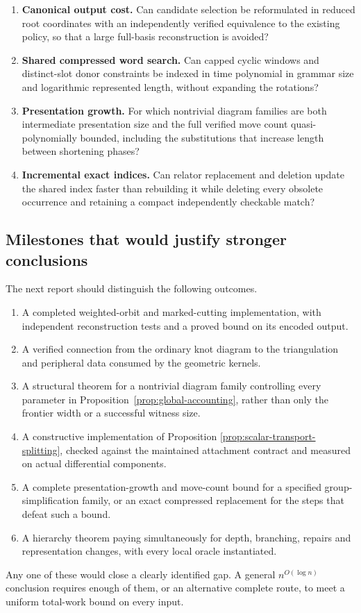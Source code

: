 \begin{enumerate}[label=Q\arabic*.,leftmargin=12mm]
arising in the scanner, can an invertible linear combination be found with
a proved cost smaller than enumerating all $2^\rho$ combinations?
\item \textbf{Canonical output cost.} Can candidate selection be reformulated
in reduced root coordinates with an independently verified equivalence to
the existing policy, so that a large full-basis reconstruction is avoided?
\item \textbf{Shared compressed word search.} Can capped cyclic windows and
distinct-slot donor constraints be indexed in time polynomial in grammar
size and logarithmic represented length, without expanding the rotations?
\item \textbf{Presentation growth.} For which nontrivial diagram families
are both intermediate presentation size and the full verified move count
quasi-polynomially bounded, including the substitutions that increase
length between shortening phases?
\item \textbf{Incremental exact indices.} Can relator replacement and deletion
update the shared index faster than rebuilding it while deleting every
obsolete occurrence and retaining a compact independently checkable match?
\end{enumerate}

\subsection{Milestones that would justify stronger conclusions}

The next report should distinguish the following outcomes.
\begin{enumerate}
\item A completed weighted-orbit and marked-cutting implementation, with
independent reconstruction tests and a proved bound on its encoded output.
\item A verified connection from the ordinary knot diagram to the
triangulation and peripheral data consumed by the geometric kernels.
\item A structural theorem for a nontrivial diagram family controlling
every parameter in Proposition~\ref{prop:global-accounting}, rather than
only the frontier width or a successful witness size.
\item A constructive implementation of Proposition
\ref{prop:scalar-transport-splitting}, checked against the maintained
attachment contract and measured on actual differential components.
\item A complete presentation-growth and move-count bound for a specified
group-simplification family, or an exact compressed replacement for the
steps that defeat such a bound.
\item A hierarchy theorem paying simultaneously for depth, branching,
repairs and representation changes, with every local oracle instantiated.
\end{enumerate}

Any one of these would close a clearly identified gap. A general
$n^{O(\log n)}$ conclusion requires enough of them, or an alternative
complete route, to meet a uniform total-work bound on every input.
